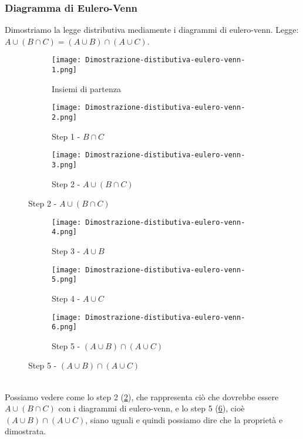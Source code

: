 \subsubsection{Diagramma di Eulero-Venn}
\begin{example}
    Dimostriamo la legge distributiva mediamente i diagrammi di eulero-venn. Legge:\\$A \cup (B \cap C) = (A \cup B) \cap (A \cup C)$.
    \begin{figure}[h!]
        \begin{subfigure}{.3\textwidth}
            \texttt{[image: Dimostrazione-distibutiva-eulero-venn-1.png]}
            \caption{Insiemi di partenza}
            \label{fig:Dimostrazione-distibutiva-eulero-venn-1}
        \end{subfigure}
        \hfill
        \begin{subfigure}{.3\textwidth}
            \texttt{[image: Dimostrazione-distibutiva-eulero-venn-2.png]}
            \caption{Step 1 - $B \cap C$}
            \label{fig:Dimostrazione-distibutiva-eulero-venn-2}
        \end{subfigure}
        \hfill
        \begin{subfigure}{.3\textwidth}
            \texttt{[image: Dimostrazione-distibutiva-eulero-venn-3.png]}
            \caption{Step 2 - $A \cup (B \cap C)$}
            \label{fig:Dimostrazione-distibutiva-eulero-venn-3}
        \end{subfigure}
    \end{figure}
    \begin{figure}[h!]
        \begin{subfigure}{.3\textwidth}
            \texttt{[image: Dimostrazione-distibutiva-eulero-venn-4.png]}
            \caption{Step 3 - $A \cup B$}
            \label{fig:Dimostrazione-distibutiva-eulero-venn-4}
        \end{subfigure}
        \hfill
        \begin{subfigure}{.3\textwidth}
            \texttt{[image: Dimostrazione-distibutiva-eulero-venn-5.png]}
            \caption{Step 4 - $A \cup C$}
            \label{fig:Dimostrazione-distibutiva-eulero-venn-5}
        \end{subfigure}
        \hfill
        \begin{subfigure}{.3\textwidth}
            \texttt{[image: Dimostrazione-distibutiva-eulero-venn-6.png]}
            \caption{Step 5 - $(A \cup B) \cap (A \cup C)$}
            \label{fig:Dimostrazione-distibutiva-eulero-venn-6}
        \end{subfigure}
    \end{figure}
    \\ Possiamo vedere come lo step 2 (\ref{fig:Dimostrazione-distibutiva-eulero-venn-2}), che rappresenta ciò che dovrebbe essere $A \cup (B \cap C)$ con i diagrammi di eulero-venn, e lo step 5 (\ref{fig:Dimostrazione-distibutiva-eulero-venn-5}), cioè $(A \cup B) \cap (A \cup C)$, siano uguali e quindi possiamo dire che la proprietà e dimostrata.  
\end{example}


